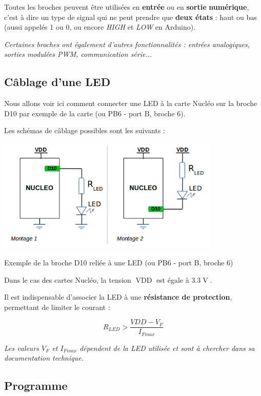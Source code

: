 \documentclass[a4paper,11pt,titlepage]{article} %
\begin{document}
Toutes les broches peuvent être utilisées en \textbf{entrée} ou en \textbf{sortie} \textbf{numérique}, c'est à dire un type de signal qui ne peut prendre que \textbf{deux états} : haut ou bas (aussi appelés 1 ou 0, ou encore \textit{HIGH} et \textit{LOW} en Arduino). 

\textit{Certaines broches ont également d'autres fonctionnalités : entrées analogiques, sorties modulées PWM, communication série...}


\subsection{Câblage d'une LED}

Nous allons voir ici comment connecter une LED à la carte Nucléo sur la broche D10 par exemple de la carte (ou PB6 - port B, broche 6).

Les schémas de câblage possibles sont les suivants :

\begin{center}
	\includegraphics[width=0.8\textwidth]{images/MINE_Nucleo_LED_Connexion.png}
	
	Exemple de la broche D10 reliée à une LED (ou PB6 - port B, broche 6)
\end{center}

Dans le cas des cartes Nucléo, la tension $\operatorname{VDD}$ est égale à $3.3\operatorname{V}$.

Il est indispensable d'associer la LED à une \textbf{résistance de protection}, permettant de limiter le courant : 

$$R_{LED} > \frac{VDD - V_{F}}{I_{Fmax}}$$

\textit{Les valeurs $V_F$ et $I_{Fmax}$ dépendent de la LED utilisée et sont à chercher dans sa documentation technique.}



\subsection{Programme}
\end{document}
